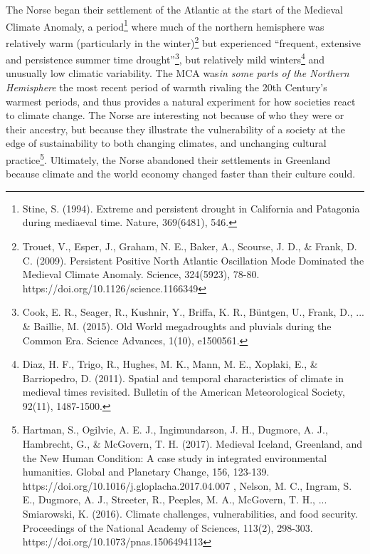 The Norse began their settlement of the Atlantic at the start of the Medieval Climate Anomaly, a period\footnote{Stine, S. (1994). Extreme and persistent drought in California and Patagonia during mediaeval time. Nature, 369(6481), 546.} where much of the northern hemisphere was relatively warm (particularly in the winter)\footnote{Trouet, V., Esper, J., Graham, N. E., Baker, A., Scourse, J. D., \& Frank, D. C. (2009). Persistent Positive North Atlantic Oscillation Mode Dominated the Medieval Climate Anomaly. Science, 324(5923), 78-80. https://doi.org/10.1126/science.1166349} but experienced ``frequent, extensive and persistence summer time drought''\footnote{Cook, E. R., Seager, R., Kushnir, Y., Briffa, K. R., B\"untgen, U., Frank, D., ... \& Baillie, M. (2015). Old World megadroughts and pluvials during the Common Era. Science Advances, 1(10), e1500561.}, but relatively mild winters\footnote{Diaz, H. F., Trigo, R., Hughes, M. K., Mann, M. E., Xoplaki, E., \& Barriopedro, D. (2011). Spatial and temporal characteristics of climate in medieval times revisited. Bulletin of the American Meteorological Society, 92(11), 1487-1500.} and unusually low climatic variability. The MCA was\emph{in some parts of the Northern Hemisphere} the most recent period of warmth rivaling the 20th Century's warmest periods, and thus provides a natural experiment for how societies react to climate change. The Norse are interesting not because of who they were or their ancestry, but because they illustrate the vulnerability of a society at the edge of sustainability to both changing climates, and unchanging cultural practice\footnote{Hartman, S., Ogilvie, A. E. J., Ingimundarson, J. H., Dugmore, A. J., Hambrecht, G., \& McGovern, T. H. (2017). Medieval Iceland, Greenland, and the New Human Condition: A case study in integrated environmental humanities. Global and Planetary Change, 156, 123-139. https://doi.org/10.1016/j.gloplacha.2017.04.007
, Nelson, M. C., Ingram, S. E., Dugmore, A. J., Streeter, R., Peeples, M. A., McGovern, T. H., ... Smiarowski, K. (2016). Climate challenges, vulnerabilities, and food security. Proceedings of the National Academy of Sciences, 113(2), 298-303. https://doi.org/10.1073/pnas.1506494113}. Ultimately, the Norse abandoned their settlements in Greenland because climate and the world economy changed faster than their culture could. \\

